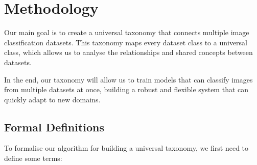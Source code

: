 \chapter{Methodology}

Our main goal is to create a universal taxonomy that connects multiple
image classification datasets.
This taxonomy maps every dataset class to a universal class,
which allows us to analyse the relationships and shared concepts between datasets.

In the end, our taxonomy will allow us to train models that can classify images
from multiple datasets at once, building a robust and flexible system
that can quickly adapt to new domains.

\section{Formal Definitions} \label{sec:taxonomy_definitions}

To formalise our algorithm for building a universal taxonomy,
we first need to define some terms:

